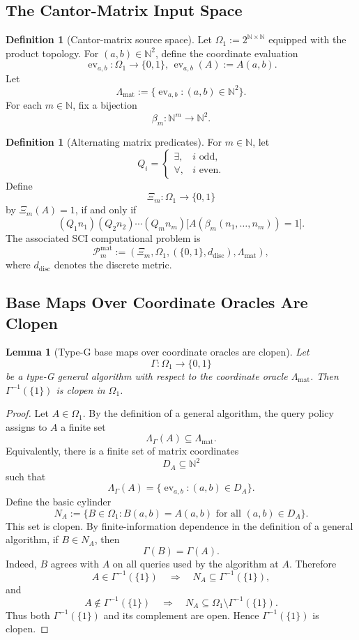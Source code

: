 \documentclass{lmcs} %
\theoremstyle{plain}
\theoremstyle{plain}
\newtheorem{lemma}[theorem]{Lemma}
\theoremstyle{definition}
\newtheorem{definition}[theorem]{Definition}
\theoremstyle{remark}
\theoremstyle{definition}
\theoremstyle{remark}
\numberwithin{equation}{section}
\begin{document}
\subsection{The Cantor-Matrix Input Space}

\begin{definition}[Cantor-matrix source space]
Let $\Omega_1:=2^{\mathbb N\times\mathbb N}$ equipped with the product topology. For \((a,b)\in\mathbb N^2\), define the coordinate evaluation
\[
\operatorname{ev}_{a,b}:\Omega_1\to\{0,1\}, \,
\operatorname{ev}_{a,b}(A):=A(a,b).
\]
Let
\[
\Lambda_{\mathrm{mat}} := \{\operatorname{ev}_{a,b}:(a,b)\in\mathbb N^2\}.
\]
For each \(m\in \mathbb{N}\), fix a bijection
\[
\beta_m:\mathbb N^m\to\mathbb N^2.
\]
\end{definition}

\begin{definition}[Alternating matrix predicates]
For \(m\in \mathbb{N}\), let
\[
Q_i=
\begin{cases}
\exists,&i\text{ odd},\\
\forall,&i\text{ even}.
\end{cases}
\]
Define
\[
\Xi_m:\Omega_1\to\{0,1\}
\]
by $\Xi_m(A)=1$, if and only if
\[
(Q_1 n_1)(Q_2 n_2)\cdots(Q_m n_m)
\bigl[A(\beta_m(n_1,\ldots,n_m))=1\bigr].
\]
The associated SCI computational problem is
\[
\mathcal P_m^{\mathrm{mat}} := (\Xi_m,\Omega_1,(\{0,1\},d_{\mathrm{disc}}),\Lambda_{\mathrm{mat}}),
\]
where $d_{\mathrm{disc}}$ denotes the discrete metric.
\end{definition}

\subsection{Base Maps Over Coordinate Oracles Are Clopen}

\begin{lemma}[Type-G base maps over coordinate oracles are clopen]\label{lem:coordinate-base-clopen}
Let
\[
\Gamma:\Omega_1\to\{0,1\}
\]
be a type-G general algorithm with respect to the coordinate oracle \(\Lambda_{\mathrm{mat}}\). Then $\Gamma^{-1}(\{1\})$ is clopen in \(\Omega_1\).
\end{lemma}

\begin{proof}
Let \(A\in\Omega_1\). By the definition of a general algorithm, the query policy assigns to \(A\) a finite set
\[
\Lambda_\Gamma(A)\subseteq\Lambda_{\mathrm{mat}}.
\]
Equivalently, there is a finite set of matrix coordinates
\[
D_A\subseteq\mathbb N^2
\]
such that
\[
\Lambda_\Gamma(A)=\{\operatorname{ev}_{a,b}:(a,b)\in D_A\}.
\]
Define the basic cylinder
\[
N_A:= \{B\in\Omega_1:B(a,b)=A(a,b)\text{ for all }(a,b)\in D_A\}.
\]
This set is clopen. By finite-information dependence in the definition of a general algorithm, if \(B\in N_A\), then
\[
\Gamma(B)=\Gamma(A).
\]
Indeed, \(B\) agrees with \(A\) on all queries used by the algorithm at \(A\). Therefore
\[
A\in\Gamma^{-1}(\{1\}) \quad\Longrightarrow\quad N_A\subseteq\Gamma^{-1}(\{1\}),
\]
and
\[
A\notin\Gamma^{-1}(\{1\}) \quad\Longrightarrow\quad N_A\subseteq\Omega_1\setminus\Gamma^{-1}(\{1\}).
\]
Thus both \(\Gamma^{-1}(\{1\})\) and its complement are open. Hence \(\Gamma^{-1}(\{1\})\) is clopen.
\end{proof}
\end{document}

